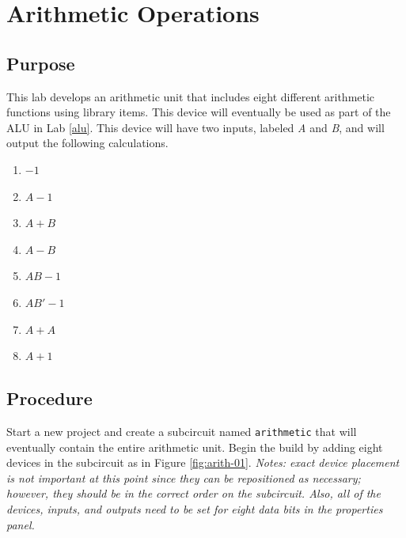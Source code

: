 \chapter{Arithmetic Operations}\label{arith}

\section{Purpose}

This lab develops an arithmetic unit that includes eight different arithmetic functions using \LE library items. This device will eventually be used as part of the \acf{ALU} in Lab \ref{alu}. This device will have two inputs, labeled \textit{A} and \textit{B}, and will output the following calculations.

\begin{enumerate}
	\item $ -1 $
	\item $ A-1 $
	\item $ A+B $
	\item $ A-B $
	\item $ AB-1 $
	\item $ AB'-1 $
	\item $ A+A $
	\item $ A+1 $
\end{enumerate}

\section{Procedure}

Start a new \LE project and create a subcircuit named \lstinline[columns=fixed]|arithmetic| that will eventually contain the entire arithmetic unit. Begin the build by adding eight devices in the subcircuit as in Figure \ref{fig:arith-01}. \textit{Notes: exact device placement is not important at this point since they can be repositioned as necessary; however, they should be in the correct order on the subcircuit. Also, all of the devices, inputs, and outputs need to be set for eight data bits in the properties panel.} 

